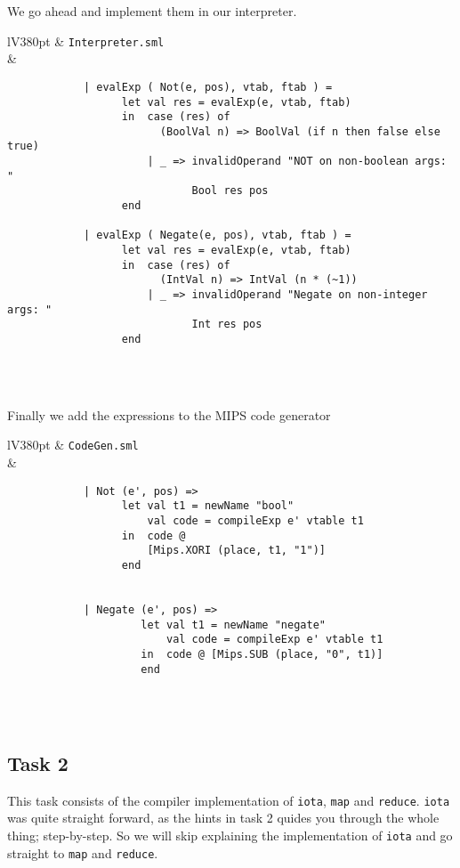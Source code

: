 \documentclass[a4paper]{article}
\begin{document}
We go ahead and implement them in our interpreter.

\begin{center}	
	\begin{tabular}{lV{380pt}}
		\toprule
		& \verb|Interpreter.sml|\\
		\midrule
		&
		\begin{verbatim}
			| evalExp ( Not(e, pos), vtab, ftab ) =
			      let val res = evalExp(e, vtab, ftab)
			      in  case (res) of
			            (BoolVal n) => BoolVal (if n then false else true)
			          | _ => invalidOperand "NOT on non-boolean args: " 
			                 Bool res pos
			      end
			
			| evalExp ( Negate(e, pos), vtab, ftab ) =
			      let val res = evalExp(e, vtab, ftab)
			      in  case (res) of
			            (IntVal n) => IntVal (n * (~1))
			          | _ => invalidOperand "Negate on non-integer args: " 
			                 Int res pos
			      end
		\end{verbatim}
		\\
		\bottomrule \\
	\end{tabular}
\end{center}

Finally we add the expressions to the MIPS code generator

\begin{center}	
	\begin{tabular}{lV{380pt}}
		\toprule
		& \verb|CodeGen.sml|\\
		\midrule
		&
		\begin{verbatim}
			| Not (e', pos) =>
			      let val t1 = newName "bool"
			          val code = compileExp e' vtable t1
			      in  code @ 
			          [Mips.XORI (place, t1, "1")]
			      end
			
			
			| Negate (e', pos) =>
			         let val t1 = newName "negate"
			             val code = compileExp e' vtable t1
			         in  code @ [Mips.SUB (place, "0", t1)]
			         end
		\end{verbatim}
		\\
		\bottomrule \\
	\end{tabular}
\end{center}

\subsection{Task 2}
This task consists of the compiler implementation of \verb|iota|, \verb|map| and \verb|reduce|. \verb|iota| was quite straight forward, as the hints in task 2 quides you through the whole thing; step-by-step. So we will skip explaining the implementation of \verb|iota| and go straight to \verb|map| and \verb|reduce|.
\end{document}
